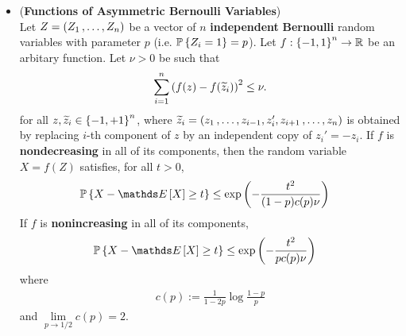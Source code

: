 \documentclass[11pt]{article}
\begin{document}
\begin{itemize}
\item \begin{proposition} (\textbf{Functions of Asymmetric Bernoulli Variables}) \citep{boucheron2013concentration} \\
Let $Z = (Z_1 \,{,}\ldots{,}\, Z_n)$ be a vector of $n$ \textbf{independent} \textbf{Bernoulli} random variables with parameter $p$ (i.e. ${\mathbb P}\left\{Z_i = 1\right\} = p$).  Let $f : \left\{-1, 1\right\}^n \to {\mathbb R}$ be an arbitary function.  Let $\nu > 0$ be such that
\begin{align*}
\sum_{i=1}^{n}\left(f(z) - f(\widetilde{z}_{i})\right)^2 \le \nu.
\end{align*} for all $z, \widetilde{z}_{i} \in \left\{-1, +1\right\}^n$, where $\widetilde{z}_{i} = (z_1 \,{,}\ldots{,}\, z_{i-1}, z_{i}', z_{i+1} \,{,}\ldots{,}\, z_n)$ is obtained by replacing $i$-th component of  $z$  by an independent copy of $z_{i}' = -z_i$. If $f$ is \textbf{nondecreasing} in all of its components,  then the random variable $X = f(Z)$ satisfies, for all $t > 0$,
\begin{align}
\bP\set{X - \E{}{X} \ge t} &\le \exp\paren{-\frac{t^2}{(1-p)c(p)\nu}} \label{ineqn: fun_nonsym_bernoulli_nondecreasing}
\end{align} If $f$ is \textbf{nonincreasing} in all of its components, 
\begin{align}
\bP\set{X - \E{}{X} \ge t} &\le \exp\paren{-\frac{t^2}{pc(p)\nu}} \label{ineqn: fun_nonsym_bernoulli_nonincreasing}
\end{align} where 
\begin{align*}
c(p) := \frac{1}{1 - 2p}\log \frac{1-p}{p}
\end{align*} and $\lim\limits_{p \to 1/2}c(p) = 2$.
\end{proposition}
\end{itemize}
\end{document}
